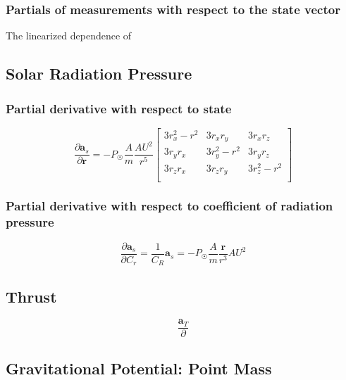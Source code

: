 \subsubsection{Partials of measurements with respect to the state vector}
The linearized dependence of 

\subsection{Solar Radiation Pressure}

\subsubsection{Partial derivative with respect to state}

\begin{equation}
    \frac{\partial{\bm{a}_{s}}}{\partial{\mathbf{r}}} =
    -P_\Sun\frac{A}{m}\frac{AU^2}{r^5}
    \begin{bmatrix}
    3r_x^2-r^2 & 3r_xr_y    & 3r_xr_z \\
    3r_yr_x    & 3r_y^2-r^2 & 3r_yr_z \\
    3r_zr_x    & 3r_zr_y    & 3r_z^2-r^2 \\
    \end{bmatrix}
    \label{eq:partial_srp_state}
\end{equation}

\subsubsection{Partial derivative with respect to coefficient of radiation pressure}

\begin{equation}
    \frac{\partial\bm{a}_{s}}{\partial{C_r}}
    =
    \frac{1}{C_R}\bm{a}_s
    =
    -P_\Sun\frac{A}{m}\frac{\mathbf{r}}{r^3}AU^2
    \label{eq:partial_srp_cr}
\end{equation}

\subsection{Thrust}

\begin{equation}
    \frac{\bm{a}_T}{\partial{}}
\end{equation}

\subsection{Gravitational Potential: Point Mass}

